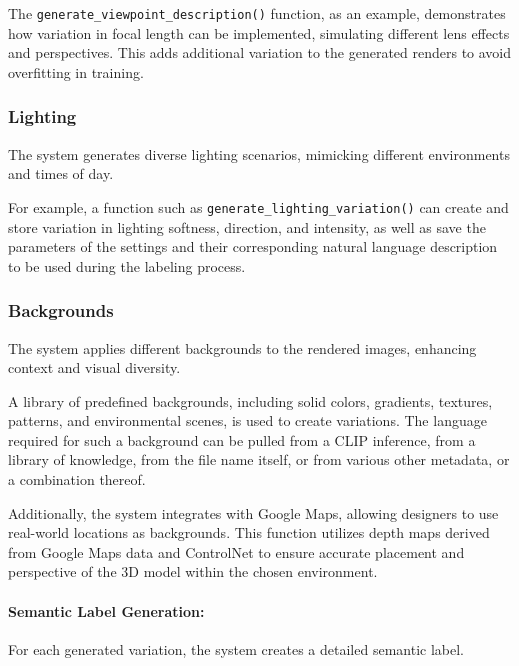 \documentclass[12pt]{report}
\begin{document}
The \texttt{generate\_viewpoint\_description()} function, as an example, demonstrates how variation in focal length can be implemented, simulating different lens effects and perspectives. This adds additional variation to the generated renders to avoid overfitting in training.


\subsubsection{Lighting} 

The system generates diverse lighting scenarios, mimicking different environments and times of day.

For example, a function such as \texttt{generate\_lighting\_variation()} can create and store variation in lighting softness, direction, and intensity, as well as save the parameters of the settings and their corresponding natural language description to be used during the labeling process. 


\subsubsection{Backgrounds}

The system applies different backgrounds to the rendered images, enhancing context and visual diversity.

A library of predefined backgrounds, including solid colors, gradients, textures, patterns, and environmental scenes, is used to create variations. The language required for such a background can be pulled from a CLIP inference, from a library of knowledge, from the file name itself, or from various other metadata, or a combination thereof.

Additionally, the system integrates with Google Maps, allowing designers to use real-world locations as backgrounds. This function utilizes depth maps derived from Google Maps data and ControlNet to ensure accurate placement and perspective of the 3D model within the chosen environment. 

\paragraph{Semantic Label Generation:} For each generated variation, the system creates a detailed semantic label.
\end{document}
